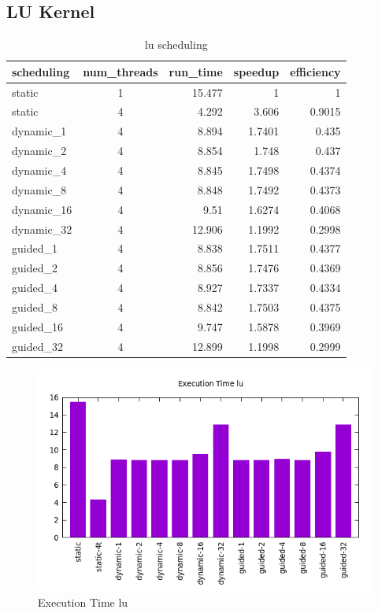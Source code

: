 \documentclass[12pt]{article}
\begin{document}
\newpage

\subsection*{LU Kernel}

\begin{table}[h!]
	\centering
	\begin{tabular}{|l|c|r|r|r|}
		\hline
		scheduling & num\_threads & run\_time & speedup & efficiency \\
		\hline
		\hline
		static & 1 & 15.477 & 1 & 1 \\
		\hline
		static & 4 & 4.292 & 3.606 & 0.9015 \\
		\hline
		dynamic\_1 & 4 & 8.894 & 1.7401 & 0.435 \\
		\hline
		dynamic\_2 & 4 & 8.854 & 1.748 & 0.437 \\
		\hline
		dynamic\_4 & 4 & 8.845 & 1.7498 & 0.4374 \\
		\hline
		dynamic\_8 & 4 & 8.848 & 1.7492 & 0.4373 \\
		\hline
		dynamic\_16 & 4 & 9.51 & 1.6274 & 0.4068 \\
		\hline
		dynamic\_32 & 4 & 12.906 & 1.1992 & 0.2998 \\
		\hline
		guided\_1 & 4 & 8.838 & 1.7511 & 0.4377 \\
		\hline
		guided\_2 & 4 & 8.856 & 1.7476 & 0.4369 \\
		\hline
		guided\_4 & 4 & 8.927 & 1.7337 & 0.4334 \\
		\hline
		guided\_8 & 4 & 8.842 & 1.7503 & 0.4375 \\
		\hline
		guided\_16 & 4 & 9.747 & 1.5878 & 0.3969 \\
		\hline
		guided\_32 & 4 & 12.899 & 1.1998 & 0.2999 \\
		\hline
	\end{tabular}
	\caption{lu scheduling}
\label{tab:chunklu}
\end{table}

\begin{figure}[h!]
	\centering
	\includegraphics[width=0.7\linewidth]{lu_scheduling_t.png}
	\caption{Execution Time lu}
	\label{fig:tklu}
\end{figure}
\end{document}
